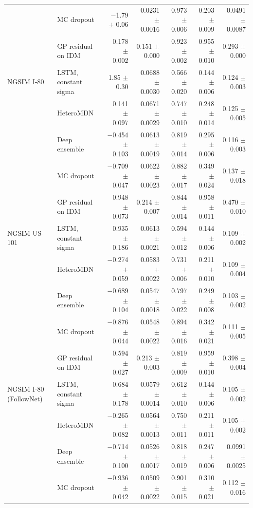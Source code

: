 \begin{table}[htbp]
\begin{tabular}{llrrrrr}
 & MC dropout & $-$1.79 $\pm$ 0.06 & 0.0231 $\pm$ 0.0016 & 0.973 $\pm$ 0.006 & 0.203 $\pm$ 0.009 & 0.0491 $\pm$ 0.0087 \\
 & GP residual on IDM & 0.178 $\pm$ 0.002 & 0.151 $\pm$ 0.000 & 0.923 $\pm$ 0.002 & 0.955 $\pm$ 0.010 & 0.293 $\pm$ 0.000 \\
\midrule
NGSIM I-80 & LSTM, constant sigma & 1.85 $\pm$ 0.30 & 0.0688 $\pm$ 0.0030 & 0.566 $\pm$ 0.020 & 0.144 $\pm$ 0.006 & 0.124 $\pm$ 0.003 \\
 & HeteroMDN & 0.141 $\pm$ 0.097 & 0.0671 $\pm$ 0.0029 & 0.747 $\pm$ 0.010 & 0.248 $\pm$ 0.014 & 0.125 $\pm$ 0.005 \\
 & Deep ensemble & $-$0.454 $\pm$ 0.103 & 0.0613 $\pm$ 0.0019 & 0.819 $\pm$ 0.014 & 0.295 $\pm$ 0.006 & 0.116 $\pm$ 0.003 \\
 & MC dropout & $-$0.709 $\pm$ 0.047 & 0.0622 $\pm$ 0.0023 & 0.882 $\pm$ 0.017 & 0.349 $\pm$ 0.024 & 0.137 $\pm$ 0.018 \\
 & GP residual on IDM & 0.948 $\pm$ 0.073 & 0.214 $\pm$ 0.007 & 0.844 $\pm$ 0.014 & 0.958 $\pm$ 0.011 & 0.470 $\pm$ 0.010 \\
\midrule
NGSIM US-101 & LSTM, constant sigma & 0.935 $\pm$ 0.186 & 0.0613 $\pm$ 0.0021 & 0.594 $\pm$ 0.012 & 0.144 $\pm$ 0.006 & 0.109 $\pm$ 0.002 \\
 & HeteroMDN & $-$0.274 $\pm$ 0.059 & 0.0583 $\pm$ 0.0022 & 0.731 $\pm$ 0.006 & 0.211 $\pm$ 0.010 & 0.109 $\pm$ 0.004 \\
 & Deep ensemble & $-$0.689 $\pm$ 0.104 & 0.0547 $\pm$ 0.0018 & 0.797 $\pm$ 0.022 & 0.249 $\pm$ 0.008 & 0.103 $\pm$ 0.002 \\
 & MC dropout & $-$0.876 $\pm$ 0.044 & 0.0548 $\pm$ 0.0022 & 0.894 $\pm$ 0.016 & 0.342 $\pm$ 0.021 & 0.111 $\pm$ 0.005 \\
 & GP residual on IDM & 0.594 $\pm$ 0.027 & 0.213 $\pm$ 0.003 & 0.819 $\pm$ 0.009 & 0.959 $\pm$ 0.010 & 0.398 $\pm$ 0.004 \\
\midrule
NGSIM I-80 (FollowNet) & LSTM, constant sigma & 0.684 $\pm$ 0.178 & 0.0579 $\pm$ 0.0014 & 0.612 $\pm$ 0.010 & 0.144 $\pm$ 0.006 & 0.105 $\pm$ 0.002 \\
 & HeteroMDN & $-$0.265 $\pm$ 0.082 & 0.0564 $\pm$ 0.0013 & 0.750 $\pm$ 0.011 & 0.211 $\pm$ 0.011 & 0.105 $\pm$ 0.002 \\
 & Deep ensemble & $-$0.714 $\pm$ 0.100 & 0.0526 $\pm$ 0.0017 & 0.818 $\pm$ 0.019 & 0.247 $\pm$ 0.006 & 0.0991 $\pm$ 0.0025 \\
 & MC dropout & $-$0.936 $\pm$ 0.042 & 0.0509 $\pm$ 0.0022 & 0.901 $\pm$ 0.015 & 0.310 $\pm$ 0.021 & 0.112 $\pm$ 0.016 \\

\end{tabular}
\end{table}
